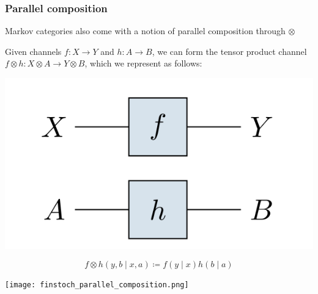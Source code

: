\begin{frame}
    \frametitle{Parallel composition} 
Markov categories also come with a notion of parallel composition through $\otimes$\par
Given channels $f: X\to Y$ and $h: A\to B$, we can form the tensor product channel $f\otimes h: X\otimes A\to Y\otimes B$, which we represent as follows:\pause

\begin{minipage}{.4\textwidth}
    \includegraphics[width=\textwidth]{graphics/string/markov_parallel.png}
\end{minipage}
\hfill
\begin{minipage}{.55\textwidth}
    \[
        f\otimes h(y, b\mid x, a)\coloneqq f(y\mid x)h(b\mid a)
    \]
\end{minipage}
\end{frame}

\begin{frame}
    \begin{center}
        \texttt{[image: finstoch\_parallel\_composition.png]}
    \end{center}
\end{frame}

